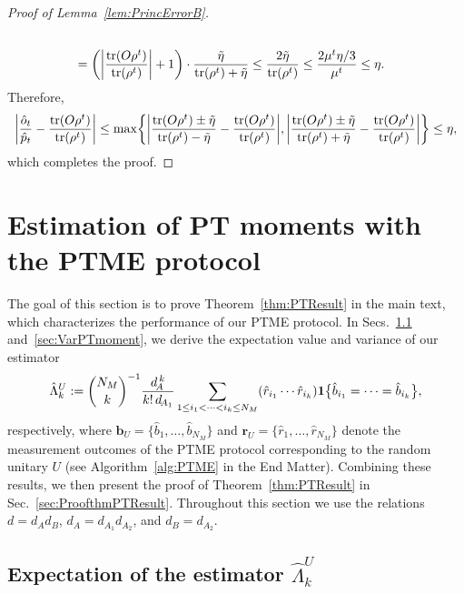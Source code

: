 \documentclass[aps,prl,twocolumn,nofootinbib,superscriptaddress,10pt]{revtex4-2}
\let\originalleft\left
\let\originalright\right
\renewcommand{\left}{\mathopen{}\mathclose\bgroup\originalleft}
\renewcommand{\right}{\aftergroup\egroup\originalright}
\newcommand{\tr}[1]{\mathrm{tr}\left( #1 \right)}
\theoremstyle{plain}
\theoremstyle{definition}
\newcommand{\lref}[1]{Lemma~\ref{#1}}
\newcommand{\tref}[1]{Theorem~\ref{#1}}
\begin{document}
\begin{proof}[Proof of \lref{lem:PrincErrorB}]
\begin{align}
		\nonumber\\
		&= \left( \left|\frac{ \tr{O\rho^t}}{\tr{\rho^t}}\right|+1 \right)  \cdot 
		\frac{\tilde\eta }{\tr{\rho^t}+\tilde\eta}
		\leq \frac{2\tilde\eta }{\tr{\rho^t}} 
		\leq \frac{2\mu^t\eta/3 }{\mu^t}
		\leq \eta. 
	\end{align}
	Therefore, 
	\begin{align}
		\left| \frac{\hat{o}_t}{\hat{p}_t} - \frac{\tr{O\rho^t}}{\tr{\rho^t}} \right|
		\leq \max\left\lbrace 
		\left| \frac{\tr{O\rho^t}\pm \tilde\eta }{\tr{\rho^t}-\tilde\eta} - \frac{\tr{O\rho^t}}{\tr{\rho^t}} \right|,
		\left| \frac{\tr{O\rho^t}\pm \tilde\eta }{\tr{\rho^t}+\tilde\eta} - \frac{\tr{O\rho^t}}{\tr{\rho^t}} \right|  \right\rbrace 
		\leq \eta, 
	\end{align}
	which completes the proof. 
\end{proof}



\section{Estimation of PT moments with  the PTME protocol}\label{sec:PTME}

The goal of this section is to prove \tref{thm:PTResult} in the main text, which characterizes the performance of our PTME protocol. 
In Secs.~\ref{sec:ExpPTmoment} and~\ref{sec:VarPTmoment}, we 
derive the expectation value and variance of our estimator 
\begin{align}\label{eq:hatLambdaPTSM}
\hat{\Lambda}_k^{U}
	:= \binom{N_M}{k}^{-1} \frac{d_{\!A}^{\,k}}{k!\, d_{\!A_1} }
	\sum_{1\leq i_1 <\dots < i_k \leq N_M} \left( \hat{r}_{i_1}\cdots \hat{r}_{i_k} \right)  \textbf{1}\big\{\hat{b}_{i_1}=\dots=\hat{b}_{i_k}\big\}, 
\end{align}
respectively, where
$\mathbf{b}_{U} = \big\{\hat{b}_1, \dots, \hat{b}_{N_M}\big\}$ and $\mathbf{r}_{U} = \{\hat{r}_1, \dots, \hat{r}_{N_M}\}$ denote the measurement outcomes of the PTME protocol corresponding to the random unitary $U$ (see Algorithm~\ref{alg:PTME} in the End Matter). 
Combining these results, we then present the proof of \tref{thm:PTResult} in Sec.~\ref{sec:ProofthmPTResult}. 
Throughout this section we use the relations $d=d_A d_B$, $d_A=d_{A_1} d_{A_2}$, and $d_B=d_{A_2}$. 


\subsection{Expectation of the estimator \texorpdfstring{$\hat{\Lambda}_k^{U}$}{}}\label{sec:ExpPTmoment}
\end{document}
